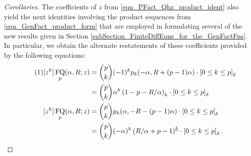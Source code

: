 \documentclass[12pt,reqno]{article}
\numberwithin{sfootnote}{section}
\numberwithin{equation}{section}
\newcommand{\tagonce}[0]{
     \addtocounter{equation}{1}
     \tag{\theequation}
}
\theoremstyle{DefaultTheoremStyle}
\theoremstyle{definition}
\newcommand{\FFactII}[2]{\ensuremath{#1^{\underline{#2}}}}
\newcommand{\Pochhammer}[2]{\ensuremath{\left(#1\right)_{#2}}}
\newcommand{\Iverson}[1]{\ensuremath{\left[#1\right]_{\delta}}}
\DeclareMathOperator{\FQ}{FQ}
\begin{document}
\begin{proof}[Corollaries] 
The coefficients of $z$ from \eqref{eqn_PFact_Qhz_product_ident} 
also yield the next identities involving the product sequences from 
\eqref{eqn_GenFact_product_form} 
that are employed in formulating several of the new results given 
in Section \ref{subSection_FiniteDiffEqns_for_the_GenFactFns}. 
In particular, we obtain the alternate restatements of these 
coefficients provided by the following equations: 
\begin{align*} 
\tagonce\label{eqn_CoeffsOfzk_FQhaRz_restmts_by_GenProductSeqs-v1} 
[z^k] \FQ_p(\alpha, R; z) & = 
     \binom{p}{k} (-1)^{k} 
     p_k(-\alpha, R + (p-1) \alpha) 
     \cdot \Iverson{0 \leq k \leq p} \\ 
     & = 
     \binom{p}{k} \alpha^{k} \Pochhammer{1-p-R / \alpha}{k} 
     \cdot \Iverson{0 \leq k \leq p} \\ 
[z^k] \FQ_p(\alpha, R; z) & = 
     \binom{p}{k} p_k(\alpha, -R - (p-1) \alpha) 
     \cdot \Iverson{0 \leq k \leq p} \\ 
     & = 
     \binom{p}{k} (-\alpha)^{k} \FFactII{\left(R / \alpha + p-1\right)}{k} 
     \cdot \Iverson{0 \leq k \leq p}. 
\qedhere 
\end{align*} 
\end{proof} 
\end{document}
